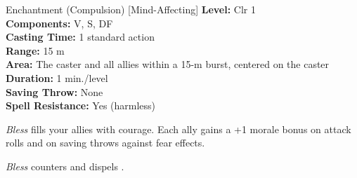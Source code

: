 {Enchantment (Compulsion) [Mind-Affecting]}
{
	\textbf{Level:}
	Clr 1\\
	\textbf{Components:}
	V, S, DF\\
	\textbf{Casting Time:}
	1 standard action\\
	\textbf{Range:}
	15 m\\
	\textbf{Area:}
	The caster and all allies within a 15-m burst, centered on the caster\\
	\textbf{Duration:}
	1 min./level\\
	\textbf{Saving Throw:}
	None\\
	\textbf{Spell Resistance:}
	Yes (harmless)\\
}
{
	\emph{Bless} fills your allies with courage. Each ally gains a +1 morale bonus on attack rolls and on saving throws against fear effects.

	\emph{Bless} counters and dispels .

}
